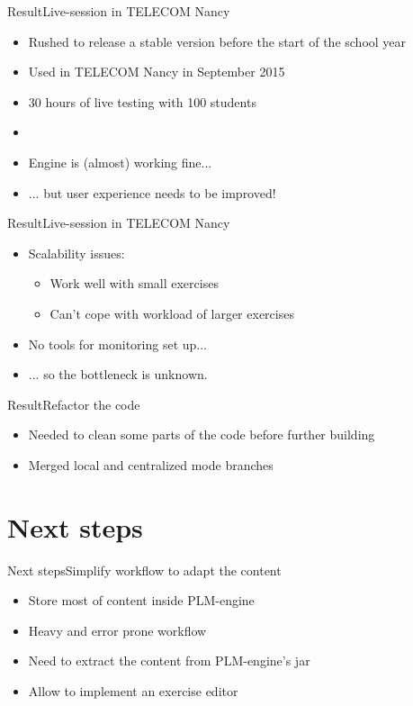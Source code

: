 \documentclass{beamer}
\begin{document}
\begin{frame}{Result}{Live-session in TELECOM Nancy}
  \begin{itemize}
  \item {
    Rushed to release a stable version before the start of the school year
  }
  \item {
    Used in TELECOM Nancy in September 2015
  }
  \item {
    30 hours of live testing with 100 students
    \pause
  }
  \item[~]
  \item {
    Engine is (almost) working fine...
  }
  \item {
    ... but user experience needs to be improved!
  }
  \end{itemize}
\end{frame}


\begin{frame}{Result}{Live-session in TELECOM Nancy}
  \begin{itemize}
  \item {
    Scalability issues:
    \begin{itemize}
    \item Work well with small exercises
    \item Can't cope with workload of larger exercises
    \end{itemize}
    \pause
  }
  \item {
    No tools for monitoring set up...
    \pause
  }
  \item {
    ... so the bottleneck is unknown.
  }
  \end{itemize}
\end{frame}

\begin{frame}{Result}{Refactor the code}
  \begin{itemize}
  \item {
    Needed to clean some parts of the code before further building
  }
  \item {
    Merged local and centralized mode branches
  }
  \end{itemize}
\end{frame}

\section{Next steps}

\begin{frame}{Next steps}{Simplify workflow to adapt the content}
  \begin{itemize}
  \item {
    Store most of content inside PLM-engine
  }
  \item {
    Heavy and error prone workflow
  }
  \item {
    Need to extract the content from PLM-engine's jar
  }
  \item {
    Allow to implement an exercise editor
  }
  \end{itemize}
\end{frame}
\end{document}
